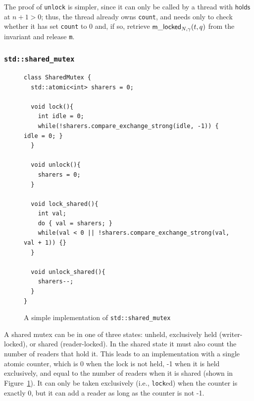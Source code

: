 The proof of \lstinline{unlock} is simpler, since it can only be called by a thread with $\mathsf{holds}$ at $n + 1 > 0$; thus, the thread already owns \lstinline{count}, and needs only to check whether it has set \lstinline{count} to 0 and, if so, retrieve $\mathsf{m\_locked}_{N, \gamma}(t, q)$ from the invariant and release \lstinline{m}.

\subsubsection{\lstinline{std::shared_mutex}}
\begin{figure}[htb]
\begin{lstlisting}[firstnumber=1]
class SharedMutex {
  std::atomic<int> sharers = 0;

  void lock(){
    int idle = 0;
    while(!sharers.compare_exchange_strong(idle, -1)) { idle = 0; }
  }

  void unlock(){
    sharers = 0;
  }

  void lock_shared(){
    int val;
    do { val = sharers; }
    while(val < 0 || !sharers.compare_exchange_strong(val, val + 1)) {}
  }

  void unlock_shared(){
    sharers--;
  }
}
\end{lstlisting}
\caption{A simple implementation of \lstinline{std::shared_mutex}}
\label{smutex-simple}
\end{figure}

A shared mutex can be in one of three states: unheld, exclusively held (writer-locked), or shared (reader-locked). In the shared state it must also count the number of readers that hold it. This leads to an implementation with a single atomic counter, which is 0 when the lock is not held, -1 when it is held exclusively, and equal to the number of readers when it is shared (shown in Figure~\ref{smutex-simple}). It can only be taken exclusively (i.e., \lstinline{lock}ed) when the counter is exactly 0, but it can add a reader as long as the counter is not -1.

